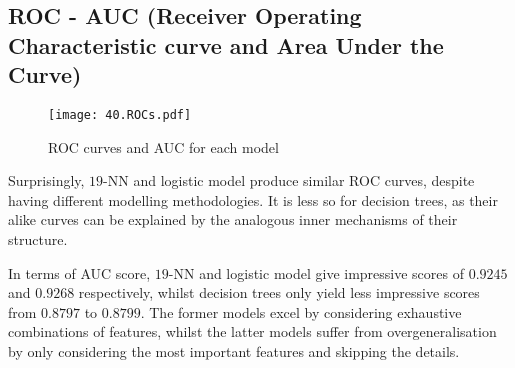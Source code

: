 

\subsection{ROC - AUC (Receiver Operating Characteristic curve and Area Under the Curve)}

\begin{figure}[H]
    \texttt{[image: 40.ROCs.pdf]}
    \caption{\centering ROC curves and AUC for each model}
\end{figure}

Surprisingly, \( 19 \)-NN and logistic model produce similar ROC curves, despite having different modelling methodologies. It is less so for decision trees, as their alike curves can be explained by the analogous inner mechanisms of their structure.

In terms of AUC score, \( 19 \)-NN and logistic model give impressive scores of \( 0.9245 \) and \( 0.9268 \) respectively, whilst decision trees only yield less impressive scores from \( 0.8797 \) to \( 0.8799 \). The former models excel by considering exhaustive combinations of features, whilst the latter models suffer from overgeneralisation by only considering the most important features and skipping the details.


